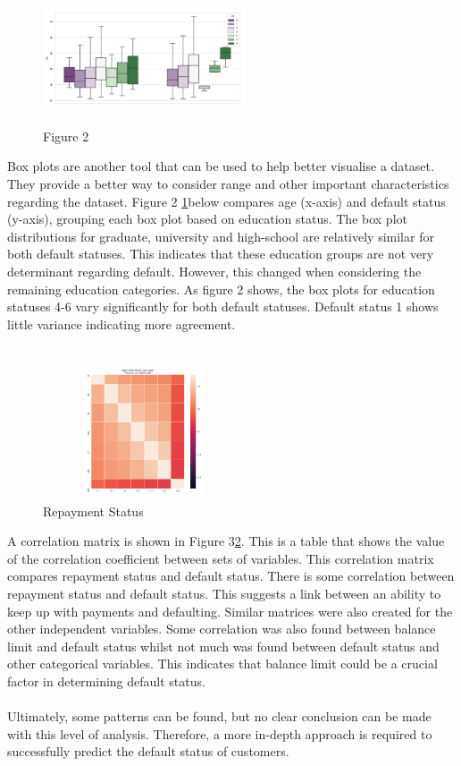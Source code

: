 \documentclass{article}
\begin{document}
\begin{figure}[h]
 \centering
 \includegraphics[width=6cm, height=4cm]{figure2.png}
 \caption{Figure 2}
 \label{fig:figure2}
\end{figure}
Box plots are another tool that can be used to help better visualise a dataset. They provide a better way to consider range and other important characteristics regarding the dataset. Figure 2 \ref{fig:figure2}below compares age (x-axis) and default status (y-axis), grouping each box plot based on education status. The box plot distributions for graduate, university and high-school are relatively similar for both default statuses. This indicates that these education groups are not very determinant regarding default. However, this changed when considering the remaining education categories. As figure 2 shows, the box plots for education statuses 4-6 vary significantly for both default statuses. Default status 1 shows little variance indicating more agreement.\\ \\
\begin{figure}[h]
 \centering
 \includegraphics[width=6cm, height=4cm]{figure3.png}
 \caption{Repayment Status}
 \label{fig:figure3}
\end{figure}
A correlation matrix is shown in Figure 3\ref{fig:figure3}. This is a table that shows the value of the correlation coefficient between sets of variables. This correlation matrix compares repayment status and default status. There is some correlation between repayment status and default status. This suggests a link between an ability to keep up with payments and defaulting. Similar matrices were also created for the other independent variables. Some correlation was also found between balance limit and default status whilst not much was found between default status and other categorical variables. This indicates that balance limit could be a crucial factor in determining default status. \\ \\
Ultimately, some patterns can be found, but no clear conclusion can be made with this level of analysis. Therefore, a more in-depth approach is required to successfully predict the default status of customers. 
\end{document}
